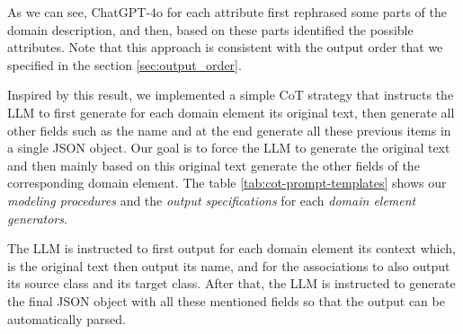 As we can see, ChatGPT-4o for each attribute first rephrased some parts of the domain description, and then, based on these parts identified the possible attributes. Note that this approach is consistent with the output order that we specified in the section \ref{sec:output_order}.

Inspired by this result, we implemented a simple CoT strategy that instructs the LLM to first generate for each domain element its original text, then generate all other fields such as the name and at the end generate all these previous items in a single JSON object. Our goal is to force the LLM to generate the original text and then mainly based on this original text generate the other fields of the corresponding domain element.
The table \ref{tab:cot-prompt-templates} shows our \emph{modeling procedures} and the \emph{output specifications} for each \emph{domain element generators}.

The LLM is instructed to first output for each domain element its context which, is the original text then output its name, and for the associations to also output its source class and its target class. After that, the LLM is instructed to generate the final JSON object with all these mentioned fields so that the output can be automatically parsed.


